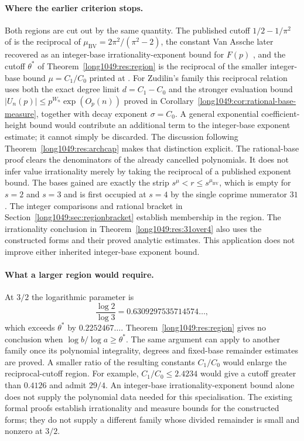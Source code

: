 \documentclass[11pt]{article}
\begin{document}
\paragraph{Where the earlier criterion stops.}
Both regions are cut out by the same quantity.  The published cutoff
$1/2-1/\pi^{2}$ of \cite[Thm.~2, p.~177]{bv1994} is the reciprocal of
$\mu_{\mathrm{BV}}=2\pi^{2}/(\pi^{2}-2)$, the constant Van Assche later
recovered as an integer-base irrationality-exponent bound for $F(p)$
\cite[Thm.~1, p.~10]{vanassche2001}, and the cutoff $\theta^{*}$ of
Theorem~\ref{long1049:res:region} is the reciprocal of the smaller integer-base bound
$\mu=C_1/C_0$ printed at \cite[p.~162]{zudilin2004}.  For Zudilin's family this reciprocal relation uses both the exact degree
limit $d=C_1-C_0$ and the stronger evaluation bound
$|U_n(p)|\le p^{W_n}\exp(O_p(n))$ proved in
Corollary~\ref{long1049:cor:rational-base-measure}, together with decay
exponent $\sigma=C_0$. A general exponential coefficient-height bound
would contribute an additional term to the integer-base exponent
estimate; it cannot simply be discarded. The discussion following
Theorem~\ref{long1049:res:archcap} makes that distinction explicit.
The rational-base proof clears the denominators of the already
cancelled polynomials. It does not infer value irrationality merely by
taking the reciprocal of a published exponent bound.  The bases
gained are exactly the strip $s^{\mu}<r\le s^{\mu_{\mathrm{BV}}}$, which is empty
for $s=2$ and $s=3$ and is first occupied at $s=4$ by the single coprime numerator
$31$.  The integer comparisons and rational bracket in
Section~\ref{long1049:sec:regionbracket} establish membership in the region.
The irrationality conclusion in Theorem~\ref{long1049:res:31over4} also uses
the constructed forms and their proved analytic estimates. This application
does not improve either inherited integer-base exponent bound.

\paragraph{What a larger region would require.}
At $3/2$ the logarithmic parameter is
\[
 \frac{\log2}{\log3}=0.6309297535714574\ldots,
\]
which exceeds $\theta^*$ by $0.2252467\ldots$.
Theorem~\ref{long1049:res:region} gives no conclusion when
$\log b/\log a\ge\theta^*$. The same argument can apply to another family
once its polynomial integrality, degrees and fixed-base remainder
estimates are proved. A smaller ratio of the resulting constants
$C_1/C_0$ would enlarge the reciprocal-cutoff region. For example,
$C_1/C_0\le2.4234$ would give a cutoff greater than $0.4126$ and admit
$29/4$. An integer-base irrationality-exponent bound alone does not
supply the polynomial data needed for this specialisation.
The existing formal proofs establish irrationality and measure bounds
for the constructed forms; they do not supply a different family
whose divided remainder is small and nonzero at $3/2$.
\end{document}
